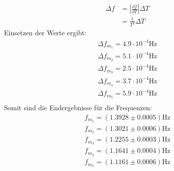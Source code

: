 \documentclass{report}
\begin{document}
\begin{equation}
    \begin{split}
        \Delta f &= \left|\frac{\partial f}{\partial T}\right| \Delta T \\
                 &= \frac{1}{T^2} \Delta T
    \end{split}
\end{equation}
Einsetzen der Werte ergibt:
\begin{equation}
    \begin{split}
        \Delta f_{m_1} = 4.9 \cdot 10^{-4} \si{\hertz} \\
        \Delta f_{m_2} = 5.1 \cdot 10^{-4} \si{\hertz} \\
        \Delta f_{m_3} = 2.5 \cdot 10^{-4} \si{\hertz} \\
        \Delta f_{m_4} = 3.7 \cdot 10^{-4} \si{\hertz} \\
        \Delta f_{m_5} = 5.9 \cdot 10^{-4} \si{\hertz} \\
    \end{split}
\end{equation}
Somit sind die Endergebnisse für die Frequenzen:
\begin{equation}
    \begin{split}
        f_{m_1} = (1.3928 \pm 0.0005) \si{\hertz} \\
        f_{m_2} = (1.3021 \pm 0.0006) \si{\hertz} \\
        f_{m_3} = (1.2255 \pm 0.0003) \si{\hertz} \\
        f_{m_4} = (1.1641 \pm 0.0004) \si{\hertz} \\
        f_{m_5} = (1.1161 \pm 0.0006) \si{\hertz} \\
    \end{split}
\end{equation}
\end{document}
